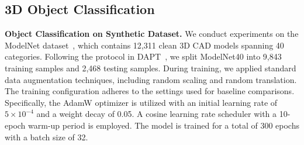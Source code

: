

\subsection{3D Object Classification}
\label{sec:classification}

\textbf{Object Classification on Synthetic Dataset.} We conduct experiments on the ModelNet dataset~\cite{wu20153d}, which contains 12,311 clean 3D CAD models spanning 40 categories. Following the protocol in DAPT~\cite{zhou2024dynamic}, we split ModelNet40 into 9,843 training samples and 2,468 testing samples. During training, we applied standard data augmentation techniques, including random scaling and random translation. The training configuration adheres to the settings used for baseline comparisons. Specifically, the AdamW optimizer is utilized with an initial learning rate of $5 \times 10^{-4}$ and a weight decay of 0.05. A cosine learning rate scheduler with a 10-epoch warm-up period is employed. The model is trained for a total of 300 epochs with a batch size of 32. 

